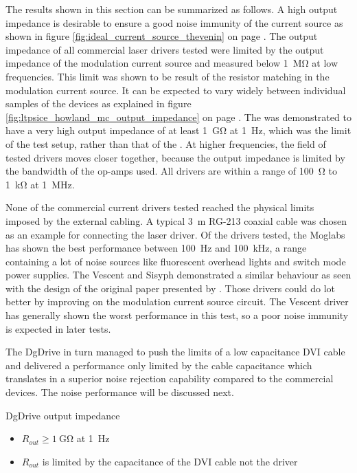 The results shown in this section can be summarized as follows. A high output impedance is desirable to ensure a good noise immunity of the current source as shown in figure \ref{fig:ideal_current_source_thevenin} on page \pageref{fig:ideal_current_source_thevenin}. The output impedance of all commercial laser drivers tested were limited by the output impedance of the modulation current source and measured below \qty{1}{\mega\ohm} at low frequencies. This limit was shown to be result of the resistor matching in the modulation current source. It can be expected to vary widely between individual samples of the devices as explained in figure \ref{fig:ltpsice_howland_mc_output_impedance} on page \pageref{fig:ltpsice_howland_mc_output_impedance}. The  was demonstrated to have a very high output impedance of at least \qty{1}{\giga\ohm} at \qty{1}{\Hz}, which was the limit of the test setup, rather than that of the . At higher frequencies, the field of tested drivers moves closer together, because the output impedance is limited by the bandwidth of the op-amps used. All drivers are within a range of \qty{100}{\ohm} to \qty{1}{\kilo\ohm} at \qty{1}{\MHz}.

None of the commercial current drivers tested reached the physical limits imposed by the external cabling. A typical \qty{3}{\m} RG-213 coaxial cable was chosen as an example for connecting the laser driver. Of the drivers tested, the Moglabs  has shown the best performance between \qty{100}{\Hz} and \qty{100}{\kHz}, a range containing a lot of noise sources like fluorescent overhead lights and switch mode power supplies. The Vescent  and Sisyph  demonstrated a similar behaviour as seen with the design of the original paper presented by \citeauthor{libbrecht_hall} \cite{libbrecht_hall}. Those drivers could do lot better by improving on the modulation current source circuit. The Vescent  driver has generally shown the worst performance in this test, so a poor noise immunity is expected in later tests.

The DgDrive in turn managed to push the limits of a low capacitance DVI cable and delivered a performance only limited by the cable capacitance which translates in a superior noise rejection capability compared to the commercial devices. The noise performance will be discussed next.
\begin{center}
    \begin{deviceProperties}[label={lst:dgDrive_output_impedance}]{DgDrive output impedance}
    \begin{itemize}
        \item $R_{out} \geq \qty{1}{\giga\ohm}$ at \qty{1}{\Hz}
        \item $R_{out}$ is limited by the capacitance of the DVI cable not the driver
    \end{itemize}
    \end{deviceProperties}
\end{center}

